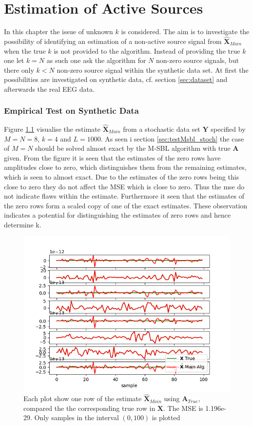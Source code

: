 \chapter{Estimation of Active Sources}\label{ch:estimation_k}
In this chapter the issue of unknown $k$ is considered. The aim is to investigate the possibility of identifying an estimation of a non-active source signal from $\hat{\textbf{X}}_{Main}$ when the true $k$ is not provided to the algorithm. Instead of providing the true $k$ one let $k=N$ as such one ask the algorithm for $N$ non-zero source signals, but there only $k<N$ non-zero source signal within the synthetic data set. 
At first the possibilities are investigated on synthetic data, cf. section \ref{sec:dataset} and afterwards the real EEG data.   

\subsection{Empirical Test on Synthetic Data}
Figure \ref{fig:ktest1} visualise the estimate $\hat{\textbf{X}}_{Main}$ from a stochastic data set $\textbf{Y}$ specified by $M=N=8$, $k=4$ and $L=1000$. 
As seen i section \ref{sec:testMsbl_stoch} the case of $M=N$ should be solved almost exact by the M-SBL algorithm with true $\textbf{A}$ given. From the figure it is seen that the estimates of the zero rows have amplitudes close to zero, which distinguishes them from the remaining estimates, which is seen to almost exact. Due to the estimates of the zero rows being this close to zero they do not affect the MSE which is close to zero. Thus the mse do not indicate flaws within the estimate. 
Furthermore it seen that the estimates of the zero rows form a scaled copy of one of the exact estimates. These observation indicates a potential for distinguishing the estimates of zero rows and hence determine k.     
\begin{figure}[H]
    \centering
	\includegraphics[scale=0.5]{figures/ch_estimate/k_test1.png}
	\caption{Each plot show one row of the estimate $\hat{\textbf{X}}_{Main}$ using $\textbf{A}_{True}$, compared the the corresponding true row in $\textbf{X}$. The MSE is 1.196e-29. Only samples in the interval $(0,100)$ is plotted}
	\label{fig:ktest1}
\end{figure}
